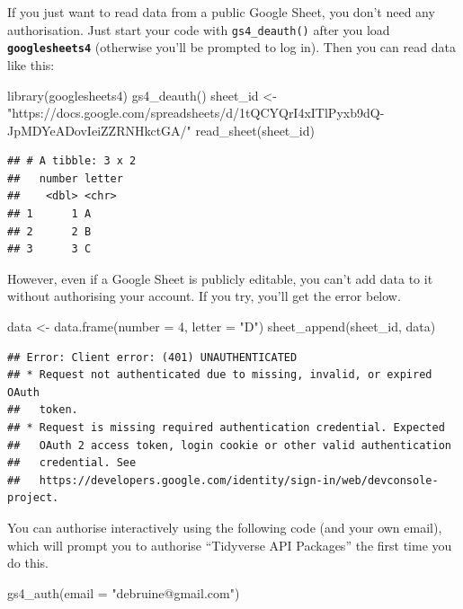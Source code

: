 \documentclass[
  oneside]{book}
\newenvironment{Shaded}{\begin{snugshade}}{\end{snugshade}}
\newcommand{\AttributeTok}[1]{\textcolor[rgb]{0.77,0.63,0.00}{#1}}
\newcommand{\DecValTok}[1]{\textcolor[rgb]{0.00,0.00,0.81}{#1}}
\newcommand{\FunctionTok}[1]{\textcolor[rgb]{0.00,0.00,0.00}{#1}}
\newcommand{\NormalTok}[1]{#1}
\newcommand{\OtherTok}[1]{\textcolor[rgb]{0.56,0.35,0.01}{#1}}
\newcommand{\StringTok}[1]{\textcolor[rgb]{0.31,0.60,0.02}{#1}}
\begin{document}
If you just want to read data from a public Google Sheet, you don't need any authorisation. Just start your code with \texttt{gs4\_deauth}\texttt{()} after you load \textbf{\texttt{googlesheets4}} (otherwise you'll be prompted to log in). Then you can read data like this:

\begin{Shaded}
\begin{Highlighting}[]
\FunctionTok{library}\NormalTok{(googlesheets4)}
\FunctionTok{gs4\_deauth}\NormalTok{()}
\NormalTok{sheet\_id }\OtherTok{\textless{}{-}} \StringTok{"https://docs.google.com/spreadsheets/d/1tQCYQrI4xITlPyxb9dQ{-}JpMDYeADovIeiZZRNHkctGA/"}
\FunctionTok{read\_sheet}\NormalTok{(sheet\_id)}
\end{Highlighting}
\end{Shaded}

\begin{verbatim}
## # A tibble: 3 x 2
##   number letter
##    <dbl> <chr> 
## 1      1 A     
## 2      2 B     
## 3      3 C
\end{verbatim}

However, even if a Google Sheet is publicly editable, you can't add data to it without authorising your account. If you try, you'll get the error below.

\begin{Shaded}
\begin{Highlighting}[]
\NormalTok{data }\OtherTok{\textless{}{-}} \FunctionTok{data.frame}\NormalTok{(}\AttributeTok{number =} \DecValTok{4}\NormalTok{, }\AttributeTok{letter =} \StringTok{"D"}\NormalTok{)}
\FunctionTok{sheet\_append}\NormalTok{(sheet\_id, data)}
\end{Highlighting}
\end{Shaded}

\begin{verbatim}
## Error: Client error: (401) UNAUTHENTICATED
## * Request not authenticated due to missing, invalid, or expired OAuth
##   token.
## * Request is missing required authentication credential. Expected
##   OAuth 2 access token, login cookie or other valid authentication
##   credential. See
##   https://developers.google.com/identity/sign-in/web/devconsole-project.
\end{verbatim}

You can authorise interactively using the following code (and your own email), which will prompt you to authorise ``Tidyverse API Packages'' the first time you do this.

\begin{Shaded}
\begin{Highlighting}[]
\FunctionTok{gs4\_auth}\NormalTok{(}\AttributeTok{email =} \StringTok{"debruine@gmail.com"}\NormalTok{)}
\end{Highlighting}
\end{Shaded}
\end{document}
